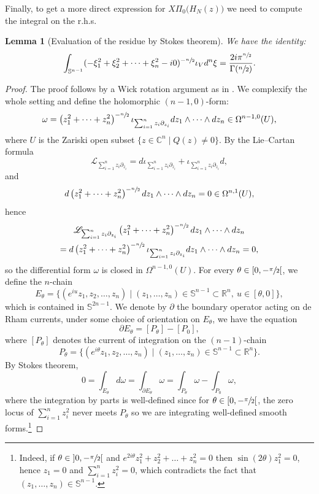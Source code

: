 \documentclass[JEP,XML,SOM,Unicode]{cedram}
\let\pazocal\mathscr
\newtheorem{lemma}[theorem]{Lemma}
\theoremstyle{definition}
\let\st\mid
\let\euler X
\let\Feuler V
\newcommand{\open}[1]{\mathopen{}\mathclose{\left]#1 \right[}}
\newcommand{\clopen}[1]{\mathopen{}\mathclose{\left[#1 \right[}}
\begin{document}
Finally, to get a more direct expression for $\euler\Pi_0 \big(H_N(z)\big)$ we need to compute the integral on the r.h.s.

\begin{lemma}[Evaluation of the residue by Stokes theorem] \label{lem:Stokes}
We have the identity:
\begin{equation}\label{restokes}
\int_{\mathbb{S}^{n-1}}
(-\xi_1^2+\xi_2^2+\dots+\xi_n^2 -i0)^{-\sfrac{n}{2}} \iota_\Feuler d^n\xi=\frac{2i\pi^{\sfrac{n}{2}}}{\Gamma(\sfrac{n}{2})}.
\end{equation}
\end{lemma}
\begin{proof}
The proof follows by a Wick rotation argument as in \cite[\S8.3]{Dang2020}.
We complexify the whole setting and
define the holomorphic $(n-1,0)$-form:
\[
\omega=\left(z_1^2+\dots+z_n^2\right)^{-\sfrac{n}{2}}\iota_{\sum_{i=1}^n z_i\partial_{z_i}} dz_1\wedge \dots\wedge dz_n \in \Omega^{n-1,0}(U),
\]
where $U$ is the Zariski open subset $\{z\in \mathbb{C}^n \st Q(z)\neq 0 \}$. By the Lie--Cartan formula
\[
\pazocal{L}_{\sum_{i=1}^n z_i\partial_{z_i}} =d \iota_{\sum_{i=1}^n z_i\partial_{z_i}}+\iota_{\sum_{i=1}^n z_i\partial_{z_i}}d,
\]
and
\[
d \left(z_1^2+\dots+z_n^2\right)^{-\sfrac{n}{2}} dz_1\wedge \dots\wedge dz_n=0 \in\Omega^{n,1}(U),
\]
hence
\begin{multline*}
\pazocal{L}_{\sum_{i=1}^n z_i\partial_{z_i}} \left(z_1^2+\dots+z_n^2\right)^{-\sfrac{n}{2}} dz_1\wedge \dots\wedge dz_n \\
= d\left(z_1^2+\dots+z_n^2\right)^{-\sfrac{n}{2}}\iota_{\sum_{i=1}^n z_i\partial_{z_i}} dz_1\wedge \dots\wedge dz_n=0,
\end{multline*}
so the differential form $\omega$ is closed in $\Omega^{n-1,0}(U)$.
For every $\theta\in \clopen{0,-\sfrac{\pi}{2}}$,
we define the $n$-chain
\[
E_\theta=\{(e^{iu}z_1,z_2,\dots,z_n) \st (z_1,\dots,z_n)\in \mathbb{S}^{n-1}\subset\mathbb{R}^n, \ u\in [\theta,0] \},
\]
which is contained in $\mathbb{S}^{2n-1}$.
We denote by $\partial$ the boundary operator acting on de Rham currents, under some choice of orientation on $E_\theta$, we have the equation
\[
\partial E_\theta=[P_\theta ] -[P_0],
\]
where $[P_\theta]$ denotes the current of integration on the $(n-1)$-chain
\[
P_\theta=\{(e^{i\theta}z_1,z_2,\dots,z_n) \st (z_1,\dots,z_n)\in \mathbb{S}^{n-1}\subset \mathbb{R}^n\}.
\]
By Stokes theorem,
\[
0= \int_{E_\theta} d\omega =\int_{\partial E_\theta } \omega=\int_{P_\theta} \omega-\int_{P_0}\omega,
\]
where the integration by parts is well-defined
since for $\theta\in \clopen{0,-\sfrac{\pi}{2}}$, the zero locus of
$ \sum_{i=1}^nz_i^2$ never meets $P_\theta$ so we are integrating well-defined smooth forms.\footnote{Indeed, if $\theta\in \open{0,-\sfrac{\pi}{2}}$ and $e^{2i\theta}z_1^2+z_2^2+\dots+z_n^2=0$ then $\sin(2\theta)z_1^2=0$, hence $z_1=0$ and $\sum_{i=1}^n z_i^2=0$, which contradicts the fact that $(z_1,\dots,z_n)\in \mathbb{S}^{n-1}$.}


\end{proof}
\end{document}
